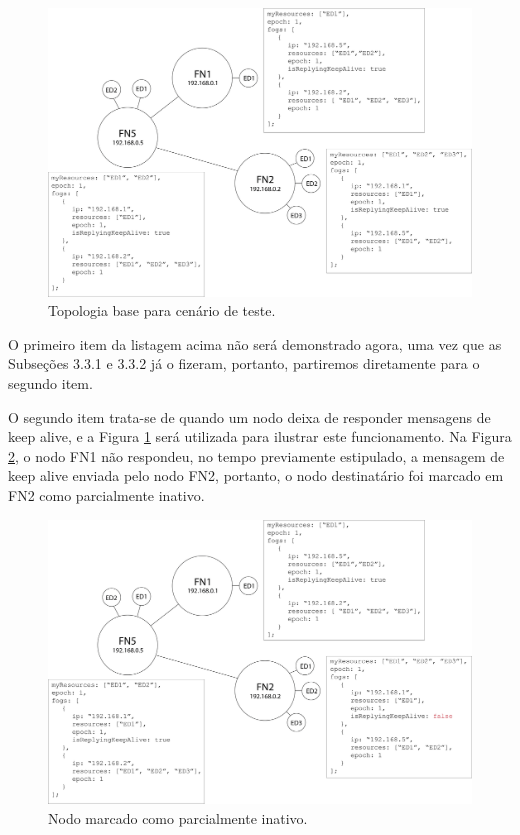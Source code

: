 \begin{figure}[H]
    \centering\includegraphics[width=.8\textwidth]{fig7.png}
    \caption%
    {\label{fig:fig7} Topologia base para cenário de teste.}
\end{figure}

O primeiro item da listagem acima não será demonstrado agora, uma vez que as Subseções 3.3.1 e 3.3.2 já o fizeram, portanto, partiremos diretamente para o segundo item.

O segundo item trata-se de quando um nodo deixa de responder mensagens de keep alive, e a Figura \ref{fig:fig7} será utilizada para ilustrar este funcionamento.
Na Figura \ref{fig:fig8}, o nodo FN1 não respondeu, no tempo previamente estipulado, a mensagem de keep alive enviada pelo nodo FN2, 
portanto, o nodo destinatário foi marcado em FN2 como parcialmente inativo.


\begin{figure}[H]
    \centering\includegraphics[width=.8\textwidth]{fig8.png}
    \caption%
    {\label{fig:fig8} Nodo marcado como parcialmente inativo.}
\end{figure}

